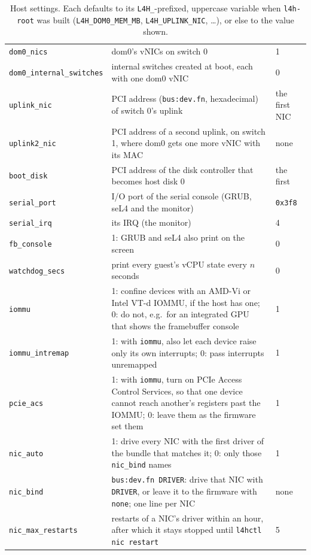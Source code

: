 \documentclass[11pt,a4paper]{report}
\newcommand{\cmd}[1]{\texttt{#1}}
\begin{document}
\begin{table}[ht]
\begin{tabularx}{\linewidth}{@{}lXl@{}}
\texttt{dom0\_nics} & dom0's vNICs on switch 0 & 1 \\
\texttt{dom0\_internal\_switches} & internal switches created at boot, each
  with one dom0 vNIC & 0 \\
\texttt{uplink\_nic} & PCI address (\texttt{bus:dev.fn}, hexadecimal) of
  switch 0's uplink & the first NIC \\
\texttt{uplink2\_nic} & PCI address of a second uplink, on switch 1, where
  dom0 gets one more vNIC with its MAC & none \\
\texttt{boot\_disk} & PCI address of the disk controller that becomes host
  disk 0 & the first \\
\texttt{serial\_port} & I/O port of the serial console (GRUB, seL4 and the
  monitor) & \texttt{0x3f8} \\
\texttt{serial\_irq} & its IRQ (the monitor) & 4 \\
\texttt{fb\_console} & 1: GRUB and seL4 also print on the screen & 0 \\
\texttt{watchdog\_secs} & print every guest's vCPU state every $n$ seconds
  & 0 \\
\texttt{iommu} & 1: confine devices with an AMD-Vi or Intel VT-d IOMMU, if the host has
  one; 0: do not, e.g.\ for an integrated GPU that shows the framebuffer
  console & 1 \\
\texttt{iommu\_intremap} & 1: with \texttt{iommu}, also let each device raise
  only its own interrupts; 0: pass interrupts unremapped & 1 \\
\texttt{pcie\_acs} & 1: with \texttt{iommu}, turn on PCIe Access Control
  Services, so that one device cannot reach another's registers past the
  IOMMU; 0: leave them as the firmware set them & 1 \\
\texttt{nic\_auto} & 1: drive every NIC with the first driver of the bundle
  that matches it; 0: only those \texttt{nic\_bind} names & 1 \\
\texttt{nic\_bind} & \texttt{bus:dev.fn DRIVER}: drive that NIC with
  \texttt{DRIVER}, or leave it to the firmware with \texttt{none}; one line
  per NIC & none \\
\texttt{nic\_max\_restarts} & restarts of a NIC's driver within an hour,
  after which it stays stopped until \cmd{l4hctl nic restart} & 5 \\
\bottomrule
\end{tabularx}
\caption{Host settings. Each defaults to its \texttt{L4H\_}-prefixed,
  uppercase variable when \texttt{l4h-root} was built
  (\texttt{L4H\_DOM0\_MEM\_MB}, \texttt{L4H\_UPLINK\_NIC}, \ldots), or else
  to the value shown.}
\label{tab:settings}
\end{table}
\end{document}
